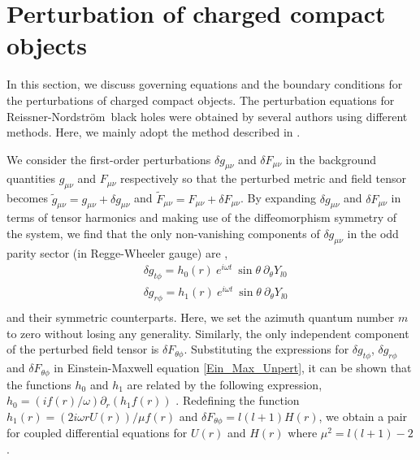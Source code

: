 \documentclass[aps,prd,twocolumn,floatfix,noshowpacs,tightenlines,noshowkeys,superscriptaddress,amsmath,amssymb,
nofootinbib]{revtex4-1}
\renewcommand\[{\begin{equation}}
\renewcommand\]{\end{equation}}
\def\RN{Reissner-Nordstr\"{o}m}
\begin{document}
\section{Perturbation of charged compact objects}\label{Sec_Perturb}
In this section, we discuss governing equations and the boundary conditions for the perturbations of charged compact objects. The perturbation equations for \RN\ black holes were obtained by several authors using different methods\cite{Moncrief:1975sb, PhysRevD.9.860,Chand}. Here, we mainly adopt the method described in \cite{PhysRevD.9.860}.\par  We consider the first-order perturbations $\delta g_{\mu\nu}$ and $\delta F_{\mu\nu}$ in the background quantities  ${g}_{\mu\nu}$ and ${F}_{\mu\nu}$ respectively so that the perturbed metric and field tensor becomes $\tilde{g}_{\mu\nu}={g}_{\mu\nu}+\delta g_{\mu\nu}$ and $\tilde{F}_{\mu\nu}=F_{\mu\nu}+\delta F_{\mu\nu}$. By expanding  $\delta g_{\mu\nu}$ and $\delta F_{\mu\nu}$ in terms of tensor harmonics and making use of the diffeomorphism symmetry of the system, we find that the only non-vanishing components of $\delta g_{\mu\nu}$ in the odd parity sector (in Regge-Wheeler gauge) are \cite{PhysRevD.9.860},   
 \begin{equation}\label{perturb_tensors}
 \begin{aligned}
 &\delta g_{t\phi}=h_0(r)~e^{i\omega t}~ \sin\theta ~\partial_\theta Y_{l0}\\
 &\delta g_{r\phi}=h_1(r)~e^{i\omega t}~  \sin\theta ~\partial_\theta Y_{l0}\\
 \end{aligned}  
 \end{equation}
 and their symmetric counterparts. Here, we set the azimuth quantum number $m$ to zero without losing any generality. Similarly, the only independent component of the perturbed field tensor is $\delta F_{\theta\phi}$. Substituting the expressions for $\delta g_{t\phi}$, $\delta g_{r\phi}$ and $\delta F_{\theta\phi}$ in Einstein-Maxwell equation \autoref{Ein_Max_Unpert}, it can be shown that the functions $h_0$ and $h_1$  are related by the following expression, $h_0=(if(r)/\omega)\partial_r(h_1 f(r))$ \cite{PhysRevD.9.860}. Redefining the function $h_1(r)=(2 i \omega r U(r))/\mu f(r)$ and $\delta F_{\theta\phi}=l(l+1) H(r) $, we obtain a pair for coupled differential equations for $U(r)$ and $H(r)$ where $\mu^2=l(l+1)-2$\cite{Chandrasekhar:1985kt}. %
\end{document}
